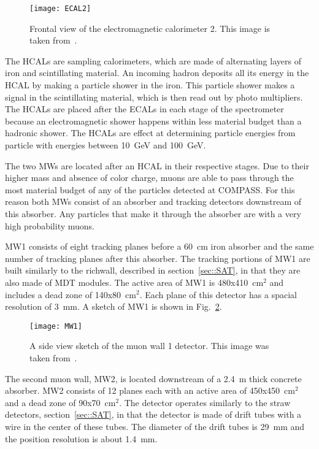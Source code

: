 \begin{figure}[h!t]
  \centering
  \texttt{[image: ECAL2]}
  \caption{Frontal view of the electromagnetic calorimeter 2.  This image is
    taken from~\cite{ABBON201569}.}
  \label{fig::ECAL2}
\end{figure}


The HCALs are sampling calorimeters, which are made of alternating layers of
iron and scintillating material.  An incoming hadron deposits all its energy in
the HCAL by making a particle shower in the iron.  This particle shower makes a
signal in the scintillating material, which is then read out by photo
multipliers.  The HCALs are placed after the ECALs in each stage of the
spectrometer because an electromagnetic shower happens within less material
budget than a hadronic shower.  The HCALs are effect at determining particle
energies from particle with energies between 10~GeV and 100~GeV. \par

The two MWs are located after an HCAL in their respective stages.  Due to their
higher mass and absence of color charge, muons are able to pass through the most
material budget of any of the particles detected at COMPASS.  For this reason
both MWs consist of an absorber and tracking detectors downstream of this
absorber.  Any particles that make it through the absorber are with a very high
probability muons. \par

MW1 consists of eight tracking planes before a 60~cm iron
absorber and the same number of tracking planes after this absorber.  The
tracking portions of MW1 are built similarly to the richwall, described in
section~\ref{sec::SAT}, in that they are also made of MDT modules.  The active
area of MW1 is 480x410~cm$^2$ and includes a dead zone of 140x80~cm$^2$.  Each
plane of this detector has a spacial resolution of 3~mm.  A sketch of MW1 is
shown in Fig.~\ref{fig::MW1}. \par

\begin{figure}[h!t]
  \centering
  \texttt{[image: MW1]}
  \caption{A side view sketch of the muon wall 1 detector.  This image was taken
    from~\cite{compassSpec}.}
  \label{fig::MW1}
\end{figure}

The second muon wall, MW2, is located downstream of a 2.4~m thick concrete
absorber.  MW2 consists of 12 planes each with an active area of 450x450~cm$^2$
and a dead zone of 90x70~cm$^2$.  The detector operates similarly to the straw
detectors, section~\ref{sec::SAT}, in that the detector is made of drift tubes
with a wire in the center of these tubes.  The diameter of the drift tubes is
29~mm and the position resolution is about 1.4~mm. \par

